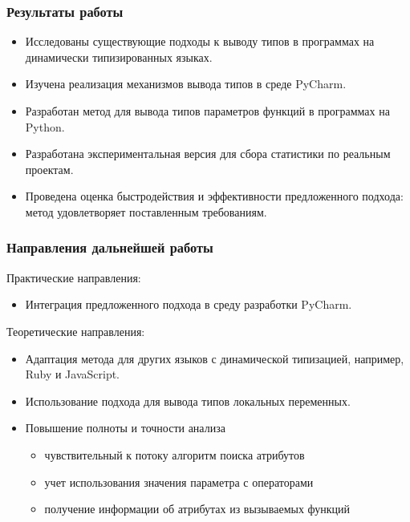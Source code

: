 \documentclass[handout]{beamer}
\begin{document}
\begin{frame}
  \frametitle{Результаты работы}

  \begin{itemize}
      \item Исследованы существующие подходы к выводу типов в программах на
        динамически типизированных языках.

      \item Изучена реализация механизмов вывода типов в среде PyCharm.

      \item Разработан метод для вывода типов параметров функций в программах на
        Python.

      \item Разработана экспериментальная версия для сбора статистики по
        реальным проектам.

      \item Проведена оценка быстродействия и эффективности предложенного
        подхода: метод удовлетворяет поставленным требованиям.
  \end{itemize}
    
\end{frame}


\begin{frame}
  \frametitle{Направления дальнейшей работы}

  Практические направления:
  \begin{itemize}
    \item Интеграция предложенного подхода в среду разработки PyCharm.
  \end{itemize}

  Теоретические направления:
  \begin{itemize}
      \item Адаптация метода для других языков с динамической типизацией,
        например, Ruby и JavaScript.

      \item Использование подхода для вывода типов локальных переменных.
      
      \item Повышение полноты и точности анализа
        \begin{itemize}
            \item чувствительный к потоку алгоритм поиска атрибутов
            \item учет использования значения параметра с операторами
            \item получение информации об атрибутах из вызываемых функций
        \end{itemize}

  \end{itemize}
    
\end{frame}
\end{document}
